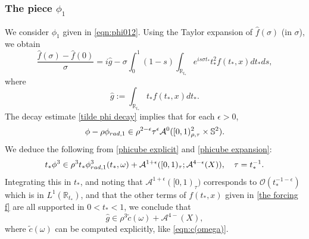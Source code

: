 \documentclass[10pt,a4paper,reqno]{amsart}
\newcommand{\RR}{\mathbb{R}}
\newcommand{\A}{\mathcal{A}}
\let\hat\widehat
\theoremstyle{definition}
\theoremstyle{remark}
\numberwithin{equation}{section}
\newcommand{\ts}{t_*}
\newcommand{\wh}{\widehat}
\begin{document}
\subsubsection{The piece $\phi_1$}
We consider $\phi_1$ given in \eqref{eqn:phi012}. Using the Taylor expansion of $\wh{f}(\sigma)$ (in $\sigma$), we obtain
\begin{equation}
\label{phi1 Taylor expansion}
    \frac{\widehat{f}(\sigma)-\widehat{f}(0)}{\sigma} = i\hat{g} - \sigma\int_0^1 (1-s)\int_{\RR_{\ts}} e^{i s\sigma\ts} \ts^2 f(\ts,x)d\ts ds,
\end{equation}
where
\begin{equation}
\label{eqn:hat g}
    \hat{g}:= \int_{\RR_{\ts}} \ts f(\ts,x)d\ts.
\end{equation}
The decay estimate \eqref{tilde phi decay} implies that for each $\epsilon>0$,
\[
	\phi-\rho\phi_{\rm{rad},1} \in \rho^{2-\epsilon}\tau^\epsilon \A^0 ([0,1)_{\rho,\tau}^2 \times \mathbb{S}^2).
\]
We deduce the following from \eqref{phicube explicit} and \eqref{phicube expansion}:
\[
    \ts\phi^3 \in \rho^3 \ts \phi_{\rm{rad},1}^3(\ts,\omega) + \A^{1+\epsilon}([0,1)_\tau;\A^{4-\epsilon}(X)),\quad\tau=\ts^{-1}.
\]
Integrating this in $\ts$, and noting that $\A^{1+\epsilon}([0,1)_\tau)$ corresponds to $\mathcal{O}(\ts^{-1-\epsilon})$ which is in $L^1(\RR_{\ts})$, and that the other terms of $f(\ts,x)$ given in \eqref{the forcing f} are all supported in $0<\ts<1$, we conclude that
\begin{equation}
\label{hat g leading term}
    \hat{g}\in \rho^3 \widetilde{c}(\omega) + \A^{4-}(X),
\end{equation}
where $\widetilde{c}(\omega)$ can be computed explicitly, like \eqref{eqn:c(omega)}. 
\end{document}
